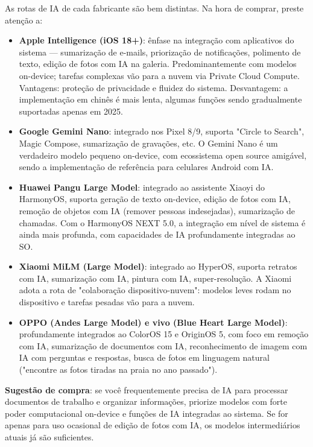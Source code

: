 
As rotas de IA de cada fabricante são bem distintas. Na hora de comprar, preste atenção a:

\begin{itemize}
  \item \textbf{Apple Intelligence (iOS 18+)}: ênfase na integração com aplicativos do sistema — sumarização de e-mails, priorização de notificações, polimento de texto, edição de fotos com IA na galeria. Predominantemente com modelos on-device; tarefas complexas vão para a nuvem via Private Cloud Compute. Vantagens: proteção de privacidade e fluidez do sistema. Desvantagem: a implementação em chinês é mais lenta, algumas funções sendo gradualmente suportadas apenas em 2025.
  \item \textbf{Google Gemini Nano}: integrado nos Pixel 8/9, suporta "Circle to Search", Magic Compose, sumarização de gravações, etc. O Gemini Nano é um verdadeiro modelo pequeno on-device, com ecossistema open source amigável, sendo a implementação de referência para celulares Android com IA.
  \item \textbf{Huawei Pangu Large Model}: integrado ao assistente Xiaoyi do HarmonyOS, suporta geração de texto on-device, edição de fotos com IA, remoção de objetos com IA (remover pessoas indesejadas), sumarização de chamadas. Com o HarmonyOS NEXT 5.0, a integração em nível de sistema é ainda mais profunda, com capacidades de IA profundamente integradas ao SO.
  \item \textbf{Xiaomi MiLM (Large Model)}: integrado ao HyperOS, suporta retratos com IA, sumarização com IA, pintura com IA, super-resolução. A Xiaomi adota a rota de "colaboração dispositivo-nuvem": modelos leves rodam no dispositivo e tarefas pesadas vão para a nuvem.
  \item \textbf{OPPO (Andes Large Model) e vivo (Blue Heart Large Model)}: profundamente integrados ao ColorOS 15 e OriginOS 5, com foco em remoção com IA, sumarização de documentos com IA, reconhecimento de imagem com IA com perguntas e respostas, busca de fotos em linguagem natural ("encontre as fotos tiradas na praia no ano passado").
\end{itemize}

\textbf{Sugestão de compra}: se você frequentemente precisa de IA para processar documentos de trabalho e organizar informações, priorize modelos com forte poder computacional on-device e funções de IA integradas ao sistema. Se for apenas para uso ocasional de edição de fotos com IA, os modelos intermediários atuais já são suficientes.

